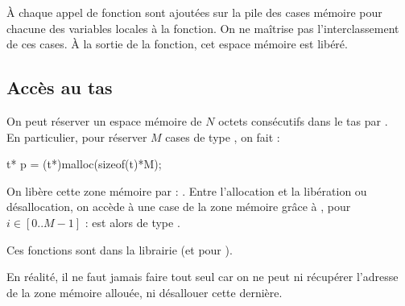 		\`A chaque appel de fonction sont ajoutées sur la pile des cases mémoire pour chacune des variables locales à la fonction. On ne maîtrise pas l'interclassement de ces cases. \`A la sortie de la fonction, cet espace mémoire est libéré.
		
	\subsection{Accès au tas}
		
		On peut réserver un espace mémoire de \(N\) octets consécutifs dans le tas par . \\
		En particulier, pour réserver \(M\) cases de type , on fait :
			\begin{C}
						  t* p = (t*)malloc(sizeof(t)*M);
			\end{C}
		On libère cette zone mémoire par : . \nt
		Entre l'allocation et la libération ou désallocation, on accède à une case de la zone mémoire grâce à , pour \(i\in[0..M-1]\) :  est alors de type .
		
		\begin{Remarque}
			Ces fonctions sont dans la librairie  (et  pour ).
		\end{Remarque}
	
		\vs{2}
		\begin{Remarque}
			En réalité, il ne faut jamais faire  tout seul car on ne peut ni récupérer l'adresse de la zone mémoire allouée, ni désallouer cette dernière.
		\end{Remarque}
